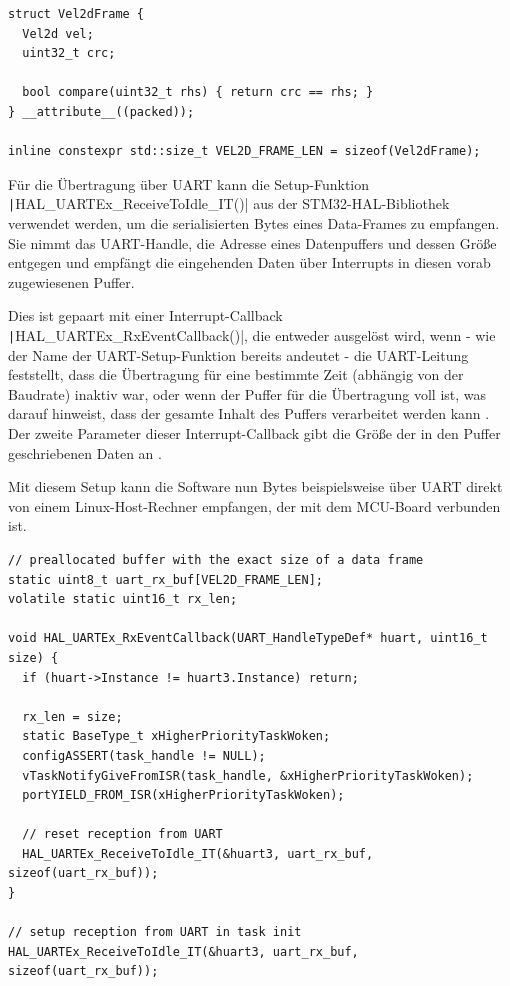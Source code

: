\begin{code}
\begin{verbatim}
struct Vel2dFrame {
  Vel2d vel;
  uint32_t crc;

  bool compare(uint32_t rhs) { return crc == rhs; }
} __attribute__((packed));

inline constexpr std::size_t VEL2D_FRAME_LEN = sizeof(Vel2dFrame);
\end{verbatim}
\end{code}

Für die Übertragung über UART kann die Setup-Funktion \linebreak
\texttt|HAL_UARTEx_ReceiveToIdle_IT()| aus der STM32-HAL-Bibliothek
verwendet werden, um die serialisierten Bytes eines Data-Frames zu empfangen.
Sie nimmt das UART-Handle, die Adresse eines Datenpuffers und dessen Größe
entgegen und empfängt die eingehenden Daten über Interrupts in diesen vorab
zugewiesenen Puffer.

Dies ist gepaart mit einer Interrupt-Callback
\texttt|HAL_UARTEx_RxEventCallback()|, die entweder ausgelöst wird,
wenn - wie der Name der UART-Setup-Funktion bereits andeutet - die UART-Leitung
feststellt, dass die Übertragung für eine bestimmte Zeit (abhängig von der
Baudrate) inaktiv war, oder wenn der Puffer für die Übertragung voll ist, was
darauf hinweist, dass der gesamte Inhalt des Puffers verarbeitet werden kann
\cite{HAL_UARTEx_ReceiveToIdle_IT}. Der zweite Parameter dieser
Interrupt-Callback gibt die Größe der in den Puffer geschriebenen Daten an
\cite{HAL_UARTEx_RxEventCallback}.

Mit diesem Setup kann die Software nun Bytes beispielsweise über UART direkt von
einem Linux-Host-Rechner empfangen, der mit dem MCU-Board verbunden ist.

\begin{code}
\begin{verbatim}
// preallocated buffer with the exact size of a data frame
static uint8_t uart_rx_buf[VEL2D_FRAME_LEN];
volatile static uint16_t rx_len;

void HAL_UARTEx_RxEventCallback(UART_HandleTypeDef* huart, uint16_t size) {
  if (huart->Instance != huart3.Instance) return;

  rx_len = size;
  static BaseType_t xHigherPriorityTaskWoken;
  configASSERT(task_handle != NULL);
  vTaskNotifyGiveFromISR(task_handle, &xHigherPriorityTaskWoken);
  portYIELD_FROM_ISR(xHigherPriorityTaskWoken);

  // reset reception from UART
  HAL_UARTEx_ReceiveToIdle_IT(&huart3, uart_rx_buf, sizeof(uart_rx_buf));
}

// setup reception from UART in task init
HAL_UARTEx_ReceiveToIdle_IT(&huart3, uart_rx_buf, sizeof(uart_rx_buf));
\end{verbatim}
\end{code}


